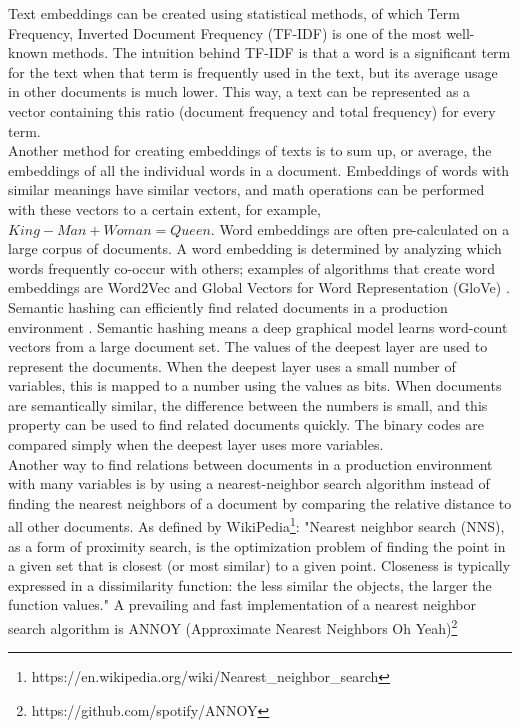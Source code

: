 Text embeddings can be created using statistical methods, of which Term Frequency, Inverted Document Frequency (TF-IDF) \citep{robertson2004tdidf} is one of the most well-known methods. The intuition behind TF-IDF is that a word is a significant term for the text when that term is frequently used in the text, but its average usage in other documents is much lower. This way, a text can be represented as a vector containing this ratio (document frequency and total frequency) for every term.\\

Another method for creating embeddings of texts is to sum up, or average, the embeddings of all the individual words in a document. Embeddings of words with similar meanings have similar vectors, and math operations can be performed with these vectors to a certain extent, for example, $King - Man + Woman = Queen$. Word embeddings are often pre-calculated on a large corpus of documents. A word embedding is determined by analyzing which words frequently co-occur with others; examples of algorithms that create word embeddings are Word2Vec \citep{mikolov2013distributed} and Global Vectors for Word Representation (GloVe) \citep{glove}.  \\

Semantic hashing can efficiently find related documents in a production environment \citep{semantichashing}. Semantic hashing means a deep graphical model learns word-count vectors from a large document set. The values of the deepest layer are used to represent the documents. When the deepest layer uses a small number of variables, this is mapped to a number using the values as bits. When documents are semantically similar, the difference between the numbers is small, and this property can be used to find related documents quickly. The binary codes are compared simply when the deepest layer uses more variables.\\
  
Another way to find relations between documents in a production environment with many variables is by using a nearest-neighbor search algorithm instead of finding the nearest neighbors of a document by comparing the relative distance to all other documents. As defined by WikiPedia\footnote{https://en.wikipedia.org/wiki/Nearest\_neighbor\_search}: "Nearest neighbor search (NNS), as a form of proximity search, is the optimization problem of finding the point in a given set that is closest (or most similar) to a given point. Closeness is typically expressed in a dissimilarity function: the less similar the objects, the larger the function values." A prevailing and fast implementation of a nearest neighbor search algorithm is ANNOY (Approximate Nearest Neighbors Oh Yeah)\footnote{https://github.com/spotify/ANNOY}

